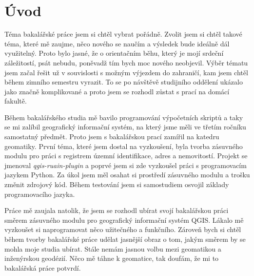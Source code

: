 \chapter{Úvod}
\label{1-uvod}

Téma bakalářské práce jsem si chtěl vybrat pořádně. Zvolit jsem si
chtěl takové téma, které mě zaujme, něco nového se naučím a výsledek
bude ideálně dál využitelný. Proto bylo jasné, že o orientačním běhu,
který je mojí srdeční záležitostí, psát nebudu, poněvadž tím bych moc
nového neobjevil. Výběr tématu jsem začal řešit už v souvislosti s
možným výjezdem do zahraničí, kam jsem chtěl během zimního semestru
vyrazit. To se po návštěvě studijního oddělení ukázalo jako značně
komplikované a proto jsem se rozhodl zůstat s prací na domácí fakultě.

Během bakalářského studia mě bavilo programování výpočetních skriptů a
taky se mi zalíbil geografický informační systém, na který jsme měli
ve třetím ročníku samostatný předmět. Proto jsem s bakalářskou prací
zamířil na katedru geomatiky. První téma, které jsem dostal na
vyzkoušení, byla tvorba zásuvného modulu pro práci s registrem územní
identifikace, adres a nemovitostí. Projekt se jmenoval
\textit{qgis-ruain-plugin} a poprvé jsem si zde vyzkoušel práci s
programovacím jazykem Python. Za úkol jsem měl osahat si prostředí
zásuvného modulu a trošku změnit zdrojový kód. Během testování jsem si
samostudiem osvojil základy programovacího jazyka.

Práce mě zaujala natolik, že jsem se rozhodl ubírat svojí bakalářskou
práci směrem zásuvného modulu pro geografický informační systém
QGIS. Lákalo mě vyzkoušet si naprogramovat něco užitečného a
funkčního. Zároveň bych si chtěl během tvorby bakalářské práce udělat
jasnější obraz o tom, jakým směrem by se mohla moje studia
ubírat. Stále nemám jasnou volbu mezi geomatikou a inženýrskou
geodézií. Něco mě táhne k geomatice, tak doufám, že mi to bakalářská
práce potvrdí.

